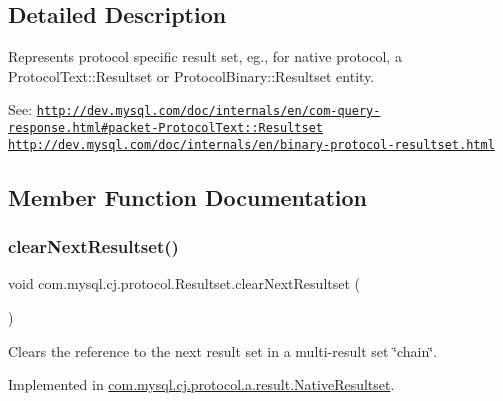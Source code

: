 \subsection{Detailed Description}
Represents protocol specific result set, eg., for native protocol, a Protocol\+Text\+::\+Resultset or Protocol\+Binary\+::\+Resultset entity.

See\+: \href{http://dev.mysql.com/doc/internals/en/com-query-response.html#packet-ProtocolText::Resultset}{\tt http\+://dev.\+mysql.\+com/doc/internals/en/com-\/query-\/response.\+html\#packet-\/\+Protocol\+Text\+::\+Resultset} \href{http://dev.mysql.com/doc/internals/en/binary-protocol-resultset.html}{\tt http\+://dev.\+mysql.\+com/doc/internals/en/binary-\/protocol-\/resultset.\+html} 

\subsection{Member Function Documentation}
\mbox{\label{interfacecom_1_1mysql_1_1cj_1_1protocol_1_1_resultset_ab66d8aa07fe7c7860c0852a7a10f4e27}} 
\subsubsection{\texorpdfstring{clear\+Next\+Resultset()}{clearNextResultset()}}
{\footnotesize\ttfamily void com.\+mysql.\+cj.\+protocol.\+Resultset.\+clear\+Next\+Resultset (\begin{DoxyParamCaption}{ }\end{DoxyParamCaption})}

Clears the reference to the next result set in a multi-\/result set \char`\"{}chain\char`\"{}. 

Implemented in \mbox{\hyperlink{classcom_1_1mysql_1_1cj_1_1protocol_1_1a_1_1result_1_1_native_resultset_a2a2679a79ede89432e8b54d6eff42138}{com.\+mysql.\+cj.\+protocol.\+a.\+result.\+Native\+Resultset}}.

\mbox{\label{interfacecom_1_1mysql_1_1cj_1_1protocol_1_1_resultset_aa09b585b364b09f418b47bd267b1758b}} 
